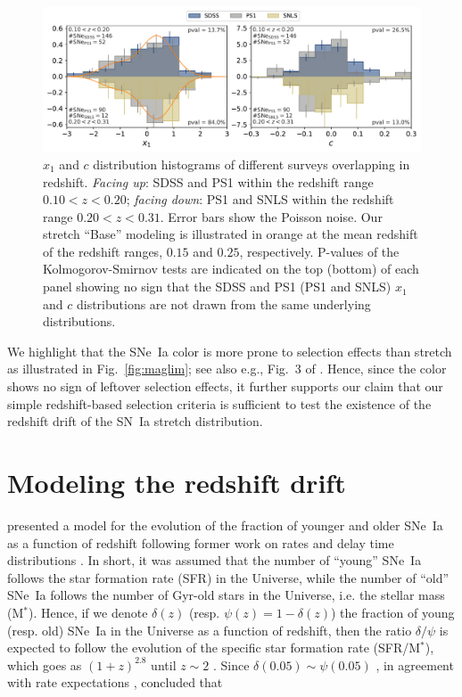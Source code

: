 \documentclass[]{aa}
\newcommand{\nn}[1]{\textcolor[rgb]{0.25, 0.50, 0}{#1}}
\begin{document}
\begin{figure}
    \centering
    \includegraphics[width=0.95\linewidth]{Article_figures/both-cut_SDSS_SNLS_PS1.pdf}
    \caption{$x_1$ and $c$ distribution histograms of different surveys
        overlapping in redshift. \textit{Facing up}: SDSS and PS1 within the
        redshift range $0.10 < z < 0.20$; \textit{facing down}: PS1 and SNLS
        within the redshift range $0.20 < z < 0.31$. Error bars show the Poisson
        noise. Our stretch ``Base'' modeling is illustrated in orange at the mean
        redshift of the redshift ranges, $0.15$ and $0.25$, respectively.
        P-values of the Kolmogorov-Smirnov tests are indicated on the top
        (bottom) of each panel showing no sign that the SDSS and PS1 (PS1 and
        SNLS) $x_1$ and $c$ distributions are not drawn from the same underlying
        distributions.}
    \label{fig:distrib}
\end{figure}

We highlight that the SNe~Ia color is more prone to selection effects than
stretch as illustrated in Fig.~\ref{fig:maglim}; see also e.g., Fig.~3 of
\cite{kessler2017}. Hence, since the color shows no sign of leftover selection
effects, it further supports our claim that our simple redshift-based selection
criteria is sufficient to test the \nn{existence of the} redshift drift of the
SN~Ia stretch distribution.

\section{Modeling the redshift drift}\label{sec:modeling}

\cite{rigault2018} presented a model for the evolution of the fraction of
younger and older SNe~Ia as a function of redshift following former work on
rates and delay time distributions \citep[e.g.,][]{mannucci2005,
scannapieco2005, sullivan2006, aubourg2008, childress2014, maozmannucci2014}.
In short, it was assumed that the number of ``young'' SNe~Ia follows the star
formation rate (SFR) in the Universe, while the number of ``old'' SNe~Ia follows
the number of Gyr-old stars in the Universe, i.e. the stellar mass (M$^*$).
Hence, if we denote $\delta(z)$ (resp. $\psi(z) = 1-\delta(z)$) the fraction of
young (resp. old) SNe~Ia in the Universe as a function of redshift, then the
ratio $\delta/\psi$ is expected to follow the evolution of the specific star
formation rate (SFR/M$^*$), which goes as $(1+z)^{2.8}$ until $z\sim2$
\citep[e.g.,][]{tasca2015}. Since $\delta(0.05) \sim \psi(0.05)$
\citep{rigault2013, rigault2018, wiseman2020}, in agreement with rate
expectations \citep{mannucci2006, rodney2014}, \cite{rigault2018} concluded that
\end{document}
